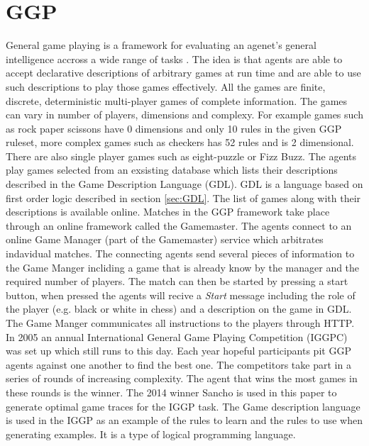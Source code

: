 \documentclass[a4paper,12pt]{report}
\begin{document}
\section{GGP}
General game playing is a framework for evaluating an agenet's general intelligence accross a wide range of tasks \cite{Cropper/IGGP}. The idea is that agents are able to accept declarative descriptions of arbitrary games at run time and are able to use such descriptions to play those games effectively. All the games are finite, discrete, deterministic
multi-player games of complete information. The games can vary in number of players, dimensions and complexy. For example games such as rock paper scissons have 0 dimensions and only 10 rules in the given GGP ruleset, more complex games such as checkers has 52 rules and is 2 dimensional. There are also single player games such as eight-puzzle or Fizz Buzz. The agents play games selected from an exsisting database which lists their descriptions described in the Game Description Language (GDL). GDL is a language based on first order logic described in section \ref{sec:GDL}. The list of games along with their descriptions is available online\cite{GGP-Website}. Matches in the GGP framework take place through an online framework called the Gamemaster. The agents connect to an online Game Manager (part of the Gamemaster) service which arbitrates indavidual matches. The connecting agents send several pieces of information to the Game Manger incliding a game that is already know by the manager and the required number of players. The match can then be started by pressing a start button, when pressed the agents will recive a \textit{Start} message including the role of the player (e.g. black or white in chess) and a description on the game in GDL. The Game Manger communicates all instructions to the players through HTTP\cite{Genesereth/GGPOverview}.
In 2005 an annual International General Game Playing Competition (IGGPC) was set up which still runs to this day. Each year hopeful participants pit GGP agents against one another to find the best one. The competitors take part in a series of rounds of increasing complexity. The agent that wins the most games in these rounds is the winner. The 2014 winner Sancho is used in this paper to generate optimal game traces for the IGGP task. The Game description language is used in the IGGP as an example of the rules to learn and the rules to use when generating examples. It is a type of logical programming language.
\end{document}
